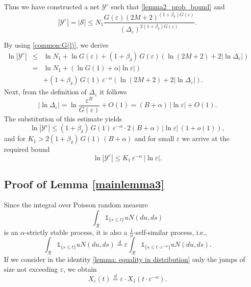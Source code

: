 \documentclass[12pt]{article}
\let\al\alpha
\let\de\delta
\let\ep\varepsilon
\newcommand\RR{\mathcal R}
\newcommand\SSS {\mathcal S}
\newcommand\YY{\mathcal Y}
\let\le\leqslant
\theoremstyle{definition}
\begin{document}
Thus we have constructed a net $\YY^\ep$ such that \eqref{lemma2_prob_bound} 
and 
\[
        |\YY^\ep| = |\SSS| \le N_1\frac{G(\ep)(2M+2)^{(1+\beta_\de)G(\ep)}}{(\Delta_\ep)^{2(1+\beta_\de)G(\ep)}}.
\]

By using \eqref{common:G(l)}, we derive
\begin{eqnarray*}
    \ln|\YY^\ep| &\le&  \ln N_1 + \ln G(\ep) +
                  (1+\beta_\de) \, G(\ep) \left( \ln (2M+2) + 2|\ln \Delta_\ep| \right)
\\
              &=&    \ln N_1 + (\ln G(1) +\alpha|\ln\ep| )
\\              
              && + (1+\beta_\de)\, G(1) \, \ep^{-\alpha} \left( \ln (2M+2) + 2|\ln \Delta_\ep| \right).
\end{eqnarray*}
Next, from the definition of $\Delta_\ep$ it follows
\[
   |\ln \Delta_\ep| = \ln \frac{\ep^B}{G(\ep)} +O(1) = (B+\alpha) \, |\ln\ep| + O(1).
\]
The substitution of this estimate yields
\[
       \ln|\YY^\ep| \le
                  (1+\beta_\de)\, G(1)\, \ep^{-\alpha} 
                  \cdot 2(B+\alpha) \, |\ln\ep| \, (1+o(1)),
\]
and for $K_1> 2(1+\beta_\de)\, G(1)\, (B+\alpha)$ and for small $\ep$ we arrive at the required bound
\begin{equation*}
                \ln|\YY^\ep|\le K_1 \, \ep^{-\al} \,|\ln\ep|.
\end{equation*}


    
\subsection{Proof of Lemma \ref{mainlemma3}}

Since the integral over Poisson random measure 
\[
     \int_{\RR}\mathds{1}_{\{s \le t\}}u N(du, ds)
\]
is an $\alpha$-strictly stable process, it is also a $\frac 1\al$-self-similar process, i.e.,
\begin{equation}\label{lemma: equality in distribution}
            \int_{\RR}\mathds{1}_{\{s \le t\}}u N(du, ds) 
    \overset{d}{=}
           \ep\int_{\RR}\mathds{1}_{\{s \le t\cdot \ep^{-\alpha}\}}u N(du, ds).
\end{equation}
If we consider in the identity \eqref{lemma: equality in distribution} only the jumps of
size not exceeding $\ep$, we obtain 
\begin{equation}\label{mainlemma3: self-similarity}
    X_\ep(t)   \overset{d}{=}  \ep \cdot X_1(t\cdot \ep^{-\alpha}).
\end{equation}
\end{document}
